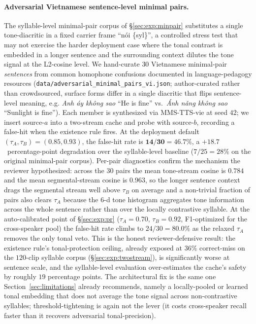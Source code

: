 \documentclass[a4paper,fleqn]{cas-dc}
\begin{document}
\paragraph{Adversarial Vietnamese sentence-level minimal pairs.} The syllable-level minimal-pair corpus of \S\ref{sec:exp:minpair} substitutes a single tone-diacritic in a fixed carrier frame ``n\'oi \{syl\}'', a controlled stress test that may not exercise the harder deployment case where the tonal contrast is embedded in a longer sentence and the surrounding context dilutes the tone signal at the L2-cosine level. We hand-curate $30$ Vietnamese minimal-pair \emph{sentences} from common homophone confusions documented in language-pedagogy resources (\texttt{data/adversarial\_minimal\_pairs\_vi.json}; author-curated rather than crowdsourced, surface forms differ in a single diacritic that flips sentence-level meaning, e.g. \emph{Anh \'ay kh\^ong sao} ``He is fine'' vs.\ \emph{\'Anh n\v{a}ng kh\^ong sao} ``Sunlight is fine''). Each member is synthesized via MMS-TTS-vie at seed $42$; we insert source-$a$ into a two-stream cache and probe with source-$b$, recording a false-hit when the existence rule fires. At the deployment default $(\tau_{A}, \tau_{B}) = (0.85, 0.93)$, the false-hit rate is $\mathbf{14/30 = 46.7\%}$, a $+18.7$~percentage-point degradation over the syllable-level baseline ($7/25 = 28\%$ on the original minimal-pair corpus). Per-pair diagnostics confirm the mechanism the reviewer hypothesized: across the $30$ pairs the mean tone-stream cosine is $0.784$ and the mean segmental-stream cosine is $0.963$, so the longer sentence context drags the segmental stream well above $\tau_{B}$ on average and a non-trivial fraction of pairs also clears $\tau_{A}$ because the 6-d tone histogram aggregates tone information across the whole sentence rather than over the locally contrastive syllable. At the auto-calibrated point of \S\ref{sec:exp:pr} ($\tau_{A} = 0.70$, $\tau_{B} = 0.92$, F1-optimized for the cross-speaker pool) the false-hit rate climbs to $24/30 = 80.0\%$ as the relaxed $\tau_{A}$ removes the only tonal veto. This is the honest reviewer-defensive result: the existence rule's tonal-protection ceiling, already exposed at $36\%$ correct-miss on the $120$-clip syllable corpus (\S\ref{sec:exp:twostream}), is significantly worse at sentence scale, and the syllable-level evaluation over-estimates the cache's safety by roughly $19$ percentage points. The architectural fix is the same one Section~\ref{sec:limitations} already recommends, namely a locally-pooled or learned tonal embedding that does not average the tone signal across non-contrastive syllables; threshold-tightening is again not the lever (it costs cross-speaker recall faster than it recovers adversarial tonal-precision).
\end{document}
